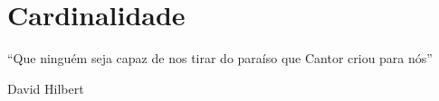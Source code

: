 \chapter{Cardinalidade}\label{cap:Cardinality}

\epigraph{``Que ninguém seja capaz de nos tirar do paraíso que Cantor criou para nós''}{David Hilbert}